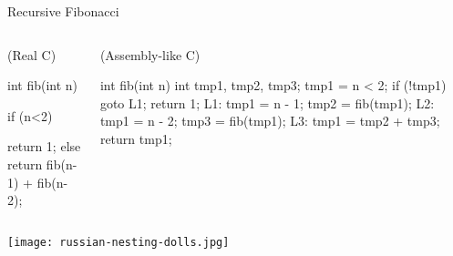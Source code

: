 \documentclass{plt}
\begin{document}
\begin{frame}[fragile]{Recursive Fibonacci}

\begin{columns}
  \begin{column}{0.2\textwidth}
    (Real C)

    \begin{C}
int fib(int n) {

  if (n<2)

    return 1;
  else
    return
       fib(n-1)
       +
       fib(n-2);

}
\end{C}
  \end{column}
  \begin{column}{0.5\textwidth}
    (Assembly-like C)

\begin{C}
int fib(int n) {
    int tmp1, tmp2, tmp3;
    tmp1 = n < 2;
    if (!tmp1) goto L1;
    return 1;
L1: tmp1 = n - 1;
    tmp2 = fib(tmp1);
L2: tmp1 = n - 2;
    tmp3 = fib(tmp1);
L3: tmp1 = tmp2 + tmp3;
    return tmp1;
}
\end{C}
  \end{column}
\end{columns}

\begin{center}
\footnotesize
{}
\texttt{[image: russian-nesting-dolls.jpg]}
\end{center}
\end{frame}

\def\mynode#1{\tikz[remember picture] \node (#1) {};}
\def\fp#1{
  \node [fill,circle,inner sep=1pt] at ($(#1.north east) + (-1pc,-19pt)$)
  (#1-fp) {};}
\def\ra#1{
  \node [fill,circle,inner sep=1pt] at ($(#1.north east) + (-1pc,-6pt)$)
  (#1-ra) {};}
\def\thefp#1{
  \node [arrow box, color=white, fill=gray, arrow box arrows={east:8pt},
         anchor=east]
  at ($(#1.north west) + (0,-6pt)$) {\sffamily \bfseries FP};
}
\def\thesp#1{
  \node [arrow box, color=white, fill=gray, arrow box arrows={east:8pt},
         anchor=east]
  at ($(#1.south west) + (0,-6pt)$) {\sffamily \bfseries SP};
}
\end{document}
